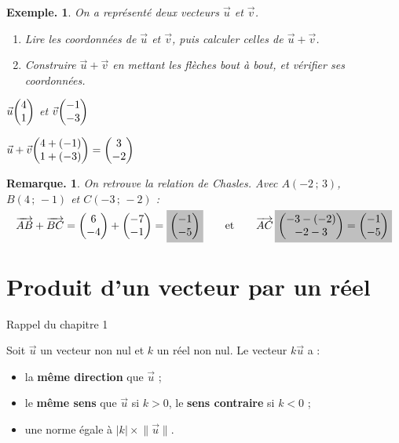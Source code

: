 \documentclass[12pt]{article}
\theoremstyle{break}
\newtheorem*{example}{Exemple.}
\newtheorem*{remark}{Remarque.}
\begin{document}
\begin{example}
  \begin{minipage}{0.5\linewidth}
    On a représenté deux vecteurs $\vec u$ et $\vec v$.
    \begin{enumerate}[label=\arabic*.]
      \item Lire les coordonnées de $\vec u$ et $\vec v$, puis calculer celles de $\vec u + \vec v$.
      \item Construire $\vec u + \vec v$ en mettant les flèches bout à bout, et vérifier ses coordonnées.
    \end{enumerate}
    \begin{reponse}
      $\vec u\col{4}{1}$ \quad et \quad $\vec v\col{-1}{-3}$

      \smallskip
      $\vec u + \vec v\col{4 + (-1)}{1 + (-3)} = \col{3}{-2}$
    \end{reponse}
  \end{minipage}
  \hfill
  \begin{minipage}{0.45\linewidth}
    \begin{center}
    \end{center}
  \end{minipage}
\end{example}

\begin{remark}
  On retrouve la relation de Chasles. Avec $A(-2\,;\,3)$, $B(4\,;\,-1)$ et $C(-3\,;\,-2)$ :
  \[
    \wvec{AB} + \wvec{BC} = \col{6}{-4} + \col{-7}{-1} = \hideM{\col{-1}{-5}}
    \qquad \text{et} \qquad
    \wvec{AC}\,\hideM{\col{-3-(-2)}{-2-3} = \col{-1}{-5}}
  \]
\end{remark}

\newpage
\section{Produit d'un vecteur par un réel}

\begin{definition}{Rappel du chapitre 1}{}
  \begin{multihide}
    Soit $\vec u$ un vecteur non nul et $k$ un réel non nul. Le vecteur $k\vec u$ a :
    \begin{itemize}
      \item la \textbf{même direction} que $\vec u$ ;
      \item le \textbf{même sens} que $\vec u$ si $k > 0$, le \textbf{sens contraire} si $k < 0$ ;
      \item une norme égale à $\lvert k \rvert \times \lVert \vec u \rVert$.
    \end{itemize}
  \end{multihide}
\end{definition}
\end{document}
